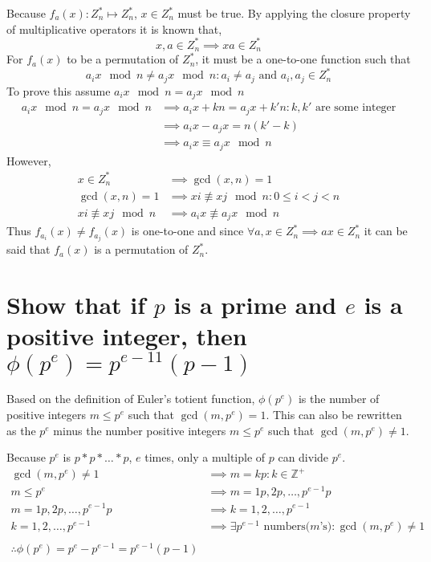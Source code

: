 \documentclass[letterpaper]{article}
\begin{document}
Because $f_a(x):Z_n^* \mapsto Z_n^*$, $x\in Z_n^*$ must be true. By applying the closure property of multiplicative operators it is known that,
\begin{equation*}
x,a\in Z_n^* \implies xa \in Z_n^*
\end{equation*}
For $f_a(x)$ to be a permutation of $Z_n^*$, it must be a one-to-one function such that 
\begin{equation*}
a_ix\mod n \neq a_jx\mod n : a_i\neq a_j \text{ and }a_i,a_j\in Z_n^*
\end{equation*}
To prove this assume $a_ix\mod n = a_jx\mod n$
\begin{align*}
a_ix\mod n = a_jx\mod n &\implies a_ix+kn = a_jx+k'n:k,k' \text{ are some integer}\\
&\implies a_ix-a_jx = n(k'-k)\\
&\implies a_ix \equiv a_jx\mod n
\end{align*}
However,
\begin{align*}
x\in Z_n^* &\implies \gcd(x,n)=1\\
\gcd(x,n)=1 &\implies xi \not\equiv xj\mod n: 0\leq i<j<n\\
xi \not\equiv xj\mod n &\implies a_ix \not\equiv a_jx\mod n
\end{align*}
Thus $f_{a_i}(x) \neq f_{a_j}(x)$ is one-to-one and since $\forall a,x\in Z_n^*\implies ax\in Z_n^*$ it can be said that $f_a(x)$ is a permutation of $Z_n^*$.


\section{Show that if $p$ is a prime and $e$ is a positive integer, then $\phi(p^e) = p^{e-11}(p - 1)$}

Based on the definition of Euler's totient function, $\phi(p^e)$ is the number of positive integers $m\leq p^e$ such that $\gcd(m,p^e)=1$. This can also be rewritten as the $p^e$ minus the number positive integers $m\leq p^e$ such that $\gcd(m,p^e)\neq1$.

Because $p^e$ is $p*p*\ldots*p$, $e$ times, only a multiple of $p$ can divide $p^e$.
\begin{align*}
\gcd(m,p^e) \neq 1 &\implies m= kp: k\in \mathbb{Z^+}\\
m \leq p^e &\implies m=1p,2p,\ldots,p^{e-1}p\\
m=1p,2p,\ldots,p^{e-1}p &\implies k=1,2,\ldots,p^{e-1}\\
k=1,2,\ldots,p^{e-1} &\implies \exists p^{e-1}\text{ numbers($m$'s)}: \gcd(m,p^e) \neq 1\\~\\
\therefore \phi(p^e) = p^e-p^{e-1} = p^{e-1}(p-1)
\end{align*}
\end{document}
